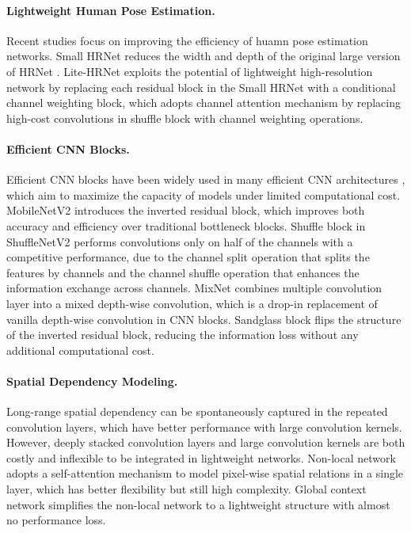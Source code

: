 \documentclass{article}
\begin{document}
\paragraph{Lightweight Human Pose Estimation.} Recent studies \cite{wang:smallhrnet,yu:litehrnet} focus on improving the efficiency of huamn pose estimation networks. Small HRNet \cite{wang:smallhrnet} reduces the width and depth of the original large version of HRNet \cite{sun:hrnet}. Lite-HRNet \cite{yu:litehrnet} exploits the potential of lightweight high-resolution network by replacing each residual block in the Small HRNet with a conditional channel weighting block, which adopts channel attention mechanism \cite{wang:senet} by replacing high-cost  convolutions in shuffle block \cite{ma:shuffle2} with channel weighting operations.

\paragraph{Efficient CNN Blocks.} Efficient CNN blocks have been widely used in many efficient CNN architectures \cite{howard:mobile1,howard:mobile3,zhang:shuffle1}, which aim to maximize the capacity of models under limited computational cost. MobileNetV2 \cite{sandler:mobile2} introduces the inverted residual block, which improves both accuracy and efficiency over traditional bottleneck blocks. Shuffle block in ShuffleNetV2 \cite{ma:shuffle2} performs convolutions only on half of the channels with a competitive performance, due to the channel split operation that splits the features by channels and the channel shuffle operation that enhances the information exchange across channels. MixNet \cite{tan:mixnet} combines multiple convolution layer into a mixed depth-wise convolution, which is a drop-in replacement of vanilla depth-wise convolution in CNN blocks. Sandglass block \cite{zhou:next} flips the structure of the inverted residual block, reducing the information loss without any additional computational cost.

\paragraph{Spatial Dependency Modeling.} Long-range spatial dependency can be spontaneously captured in the repeated convolution layers, which have better performance with large convolution kernels. However, deeply stacked convolution layers and large convolution kernels are both costly and inflexible to be integrated in lightweight networks. Non-local network \cite{wang:nonlocal} adopts a self-attention mechanism to model pixel-wise spatial relations in a single layer, which has better flexibility but still high complexity. Global context network \cite{cao:gcnet} simplifies the non-local network to a lightweight structure with almost no performance loss.
\end{document}
